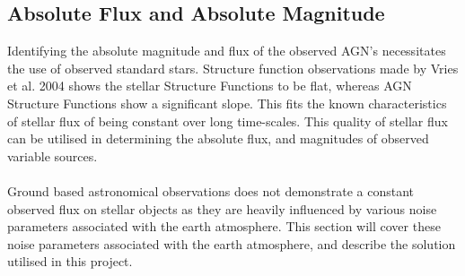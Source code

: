 \documentclass[a4paper, 12pt, twoside]{article}
\begin{document}
\subsection{Absolute Flux and Absolute Magnitude}
Identifying the absolute magnitude and flux of the observed AGN's necessitates the use of observed standard stars. Structure function observations made by Vries et al. 2004 shows the stellar Structure Functions to be flat, whereas AGN Structure Functions show a significant slope. This fits the known characteristics of stellar flux of being constant over long time-scales. This quality of stellar flux can be utilised in determining the absolute flux, and magnitudes of observed variable sources. \\
\\
Ground based astronomical observations does not demonstrate a constant observed flux on stellar objects as they are heavily influenced by various noise parameters associated with the earth atmosphere. This section will cover these noise parameters associated with the earth atmosphere, and describe the solution utilised in this project. \\
\end{document}
